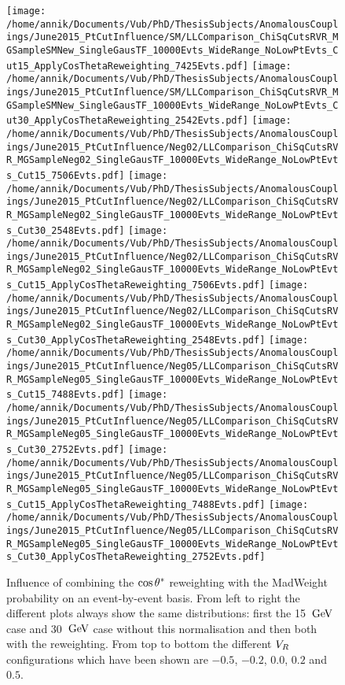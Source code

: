 \begin{figure}[h!t]
 \texttt{[image: /home/annik/Documents/Vub/PhD/ThesisSubjects/AnomalousCouplings/June2015\_PtCutInfluence/SM/LLComparison\_ChiSqCutsRVR\_MGSampleSMNew\_SingleGausTF\_10000Evts\_WideRange\_NoLowPtEvts\_Cut15\_ApplyCosThetaReweighting\_7425Evts.pdf]}
 \texttt{[image: /home/annik/Documents/Vub/PhD/ThesisSubjects/AnomalousCouplings/June2015\_PtCutInfluence/SM/LLComparison\_ChiSqCutsRVR\_MGSampleSMNew\_SingleGausTF\_10000Evts\_WideRange\_NoLowPtEvts\_Cut30\_ApplyCosThetaReweighting\_2542Evts.pdf]}
 \texttt{[image: /home/annik/Documents/Vub/PhD/ThesisSubjects/AnomalousCouplings/June2015\_PtCutInfluence/Neg02/LLComparison\_ChiSqCutsRVR\_MGSampleNeg02\_SingleGausTF\_10000Evts\_WideRange\_NoLowPtEvts\_Cut15\_7506Evts.pdf]}
 \texttt{[image: /home/annik/Documents/Vub/PhD/ThesisSubjects/AnomalousCouplings/June2015\_PtCutInfluence/Neg02/LLComparison\_ChiSqCutsRVR\_MGSampleNeg02\_SingleGausTF\_10000Evts\_WideRange\_NoLowPtEvts\_Cut30\_2548Evts.pdf]}
 \texttt{[image: /home/annik/Documents/Vub/PhD/ThesisSubjects/AnomalousCouplings/June2015\_PtCutInfluence/Neg02/LLComparison\_ChiSqCutsRVR\_MGSampleNeg02\_SingleGausTF\_10000Evts\_WideRange\_NoLowPtEvts\_Cut15\_ApplyCosThetaReweighting\_7506Evts.pdf]}
 \texttt{[image: /home/annik/Documents/Vub/PhD/ThesisSubjects/AnomalousCouplings/June2015\_PtCutInfluence/Neg02/LLComparison\_ChiSqCutsRVR\_MGSampleNeg02\_SingleGausTF\_10000Evts\_WideRange\_NoLowPtEvts\_Cut30\_ApplyCosThetaReweighting\_2548Evts.pdf]}
 \texttt{[image: /home/annik/Documents/Vub/PhD/ThesisSubjects/AnomalousCouplings/June2015\_PtCutInfluence/Neg05/LLComparison\_ChiSqCutsRVR\_MGSampleNeg05\_SingleGausTF\_10000Evts\_WideRange\_NoLowPtEvts\_Cut15\_7488Evts.pdf]}
 \texttt{[image: /home/annik/Documents/Vub/PhD/ThesisSubjects/AnomalousCouplings/June2015\_PtCutInfluence/Neg05/LLComparison\_ChiSqCutsRVR\_MGSampleNeg05\_SingleGausTF\_10000Evts\_WideRange\_NoLowPtEvts\_Cut30\_2752Evts.pdf]}
 \texttt{[image: /home/annik/Documents/Vub/PhD/ThesisSubjects/AnomalousCouplings/June2015\_PtCutInfluence/Neg05/LLComparison\_ChiSqCutsRVR\_MGSampleNeg05\_SingleGausTF\_10000Evts\_WideRange\_NoLowPtEvts\_Cut15\_ApplyCosThetaReweighting\_7488Evts.pdf]}
 \texttt{[image: /home/annik/Documents/Vub/PhD/ThesisSubjects/AnomalousCouplings/June2015\_PtCutInfluence/Neg05/LLComparison\_ChiSqCutsRVR\_MGSampleNeg05\_SingleGausTF\_10000Evts\_WideRange\_NoLowPtEvts\_Cut30\_ApplyCosThetaReweighting\_2752Evts.pdf]}
 \caption{Influence of combining the $\cos \theta^{*}$ reweighting with the MadWeight probability on an event-by-event basis. From left to right the different plots always show the same distributions: first the 15 $\, \mathrm{GeV}$ case and 30 $\, \mathrm{GeV}$ case without this normalisation and then both with the reweighting. From top to bottom the different $V_{R}$ configurations which have been shown are $-0.5$, $-0.2$, $0.0$, $0.2$ and $0.5$.}
 \label{fig::CosThetaNorm}
 \end{figure}

